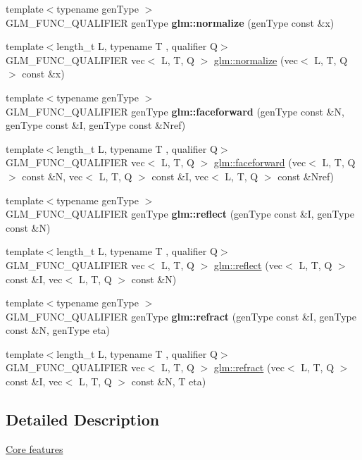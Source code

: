 \begin{DoxyCompactItemize}
\item 
\mbox{\label{func__geometric_8inl_a213a489b64d438c533ea56f4cb2d2426}} 
{\footnotesize template$<$typename gen\+Type $>$ }\\G\+L\+M\+\_\+\+F\+U\+N\+C\+\_\+\+Q\+U\+A\+L\+I\+F\+I\+ER gen\+Type {\bfseries glm\+::normalize} (gen\+Type const \&x)
\item 
{\footnotesize template$<$length\+\_\+t L, typename T , qualifier Q$>$ }\\G\+L\+M\+\_\+\+F\+U\+N\+C\+\_\+\+Q\+U\+A\+L\+I\+F\+I\+ER vec$<$ L, T, Q $>$ \hyperlink{group__core__func__geometric_ga3b8d3dcae77870781392ed2902cce597}{glm\+::normalize} (vec$<$ L, T, Q $>$ const \&x)
\item 
\mbox{\label{func__geometric_8inl_ad32c7f0f9f0ca45467adbb4a1db5184d}} 
{\footnotesize template$<$typename gen\+Type $>$ }\\G\+L\+M\+\_\+\+F\+U\+N\+C\+\_\+\+Q\+U\+A\+L\+I\+F\+I\+ER gen\+Type {\bfseries glm\+::faceforward} (gen\+Type const \&N, gen\+Type const \&I, gen\+Type const \&Nref)
\item 
{\footnotesize template$<$length\+\_\+t L, typename T , qualifier Q$>$ }\\G\+L\+M\+\_\+\+F\+U\+N\+C\+\_\+\+Q\+U\+A\+L\+I\+F\+I\+ER vec$<$ L, T, Q $>$ \hyperlink{group__core__func__geometric_ga7aed0a36c738169402404a3a5d54e43b}{glm\+::faceforward} (vec$<$ L, T, Q $>$ const \&N, vec$<$ L, T, Q $>$ const \&I, vec$<$ L, T, Q $>$ const \&Nref)
\item 
\mbox{\label{func__geometric_8inl_acdc166d33265ec31212f230e9db8db36}} 
{\footnotesize template$<$typename gen\+Type $>$ }\\G\+L\+M\+\_\+\+F\+U\+N\+C\+\_\+\+Q\+U\+A\+L\+I\+F\+I\+ER gen\+Type {\bfseries glm\+::reflect} (gen\+Type const \&I, gen\+Type const \&N)
\item 
{\footnotesize template$<$length\+\_\+t L, typename T , qualifier Q$>$ }\\G\+L\+M\+\_\+\+F\+U\+N\+C\+\_\+\+Q\+U\+A\+L\+I\+F\+I\+ER vec$<$ L, T, Q $>$ \hyperlink{group__core__func__geometric_ga5631dd1d5618de5450b1ea3cf3e94905}{glm\+::reflect} (vec$<$ L, T, Q $>$ const \&I, vec$<$ L, T, Q $>$ const \&N)
\item 
\mbox{\label{func__geometric_8inl_ae4b0245b42a72957d3026ac365731821}} 
{\footnotesize template$<$typename gen\+Type $>$ }\\G\+L\+M\+\_\+\+F\+U\+N\+C\+\_\+\+Q\+U\+A\+L\+I\+F\+I\+ER gen\+Type {\bfseries glm\+::refract} (gen\+Type const \&I, gen\+Type const \&N, gen\+Type eta)
\item 
{\footnotesize template$<$length\+\_\+t L, typename T , qualifier Q$>$ }\\G\+L\+M\+\_\+\+F\+U\+N\+C\+\_\+\+Q\+U\+A\+L\+I\+F\+I\+ER vec$<$ L, T, Q $>$ \hyperlink{group__core__func__geometric_ga01da3dff9e2ef6b9d4915c3047e22b74}{glm\+::refract} (vec$<$ L, T, Q $>$ const \&I, vec$<$ L, T, Q $>$ const \&N, T eta)
\end{DoxyCompactItemize}


\subsection{Detailed Description}
\hyperlink{group__core}{Core features} 